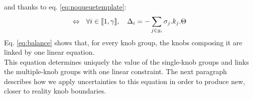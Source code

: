and thanks to eq. \ref{eq:noqueuetemplate}:
\begin{equation}
\centering
\label{eq:balance}
\Leftrightarrow\ \ \forall i \in \llbracket 1,\gamma \rrbracket,\ \ \ \Delta_{i}=-\sum\limits_{j\in g_{i}}\sigma_{j}.k_{j}.\Theta
\end{equation}
Eq. \ref{eq:balance} shows that, for every knob group, the knobs composing it are linked by one linear equation.\\
This equation determines uniquely the value of the single-knob groups and links the multiple-knob groups with one linear constraint. The next paragraph describes how we apply uncertainties to this equation in order to produce new, closer to reality knob boundaries.\\

